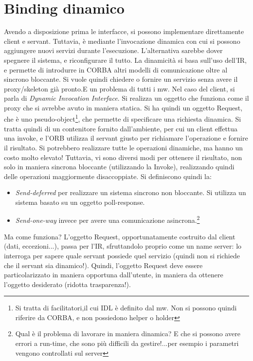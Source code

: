 \section{Binding dinamico}
Avendo a disposizione prima le interfacce, si possono implementare direttamente client e servant. Tuttavia, è mediante
l'invocazione dinamica con cui si possono aggiungere nuovi servizi durante l'esecuzione. L'alternativa sarebbe
dover spegnere il sistema, e riconfigurare il tutto. La dinamicità si basa sull'uso dell'IR, e permette di introdurre in
CORBA altri modelli di comunicazione oltre al sincrono bloccante.
Si vuole quindi chiedere o fornire un servizio senza avere il proxy/skeleton già pronto.E un problema di tutti i mw.
Nel caso del client, si parla di \textit{Dynamic Invocation Interface}. Si realizza un oggetto che funziona come il
proxy che si avrebbe avuto in maniera statica. Si ha quindi un oggetto Request, che è uno pseudo-object\footnote{Si
tratta di facilitatori,il cui IDL è definito dal mw. Non si possono quindi riferire da CORBA,
e non possiedono helper o holder}, che permette di specificare una richiesta dinamica. Si tratta quindi di un
contenitore fornito dall'ambiente, per cui un client effettua una invoke, e l'ORB utilizza il servant giusto per
richiamare l'operazione e fornire il risultato. Si potrebbero realizzare tutte le operazioni dinamiche, ma hanno un
costo molto elevato! Tuttavia, vi sono diversi modi per ottenere il risultato, non solo in maniera sincrona bloccante
(utilizzando la Invoke), realizzando quindi delle operazioni maggiormente disaccoppiate. Si definiscono quindi la:
\begin{itemize}
 \item \textit{Send-deferred} per realizzare un sistema sincrono non bloccante. Si utilizza un sistema basato su un
 oggetto poll-response.
 \item \textit{Send-one-way} invece per avere una comunicazione asincrona.\footnote{Qual è il problema di lavorare in maniera
 dinamica? E che si possono avere errori a run-time, che sono più difficili da gestire!...per esempio i parametri vengono controllati sul server}
\end{itemize}
Ma come funziona? L'oggetto Request, opportunatamente costruito dal client (dati, eccezioni...), passa per l'IR,
sfruttandolo proprio come un name server: lo interroga per sapere quale servant possiede quel servizio (quindi non si
richiede che il servant sia dinamico!). Quindi, l'oggetto Request deve essere particolarizzato in maniera opportuna
dall'utente, in maniera da ottenere l'oggetto desiderato (ridotta trasparenza!).
